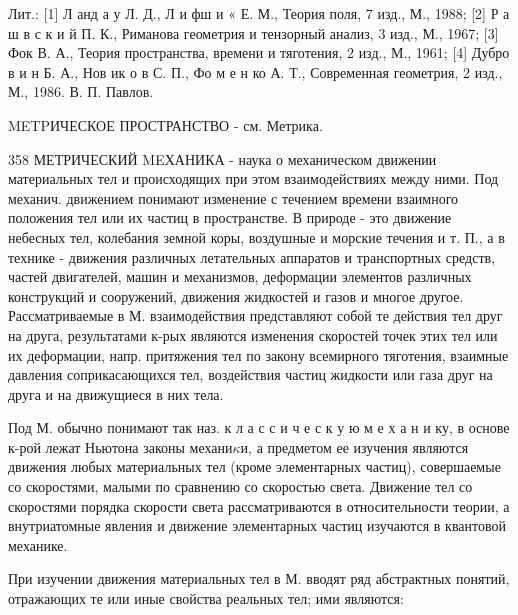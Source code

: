 \documentclass[10pt]{article}
\begin{document}
Лит.: [1] Л анд а у Л. Д., Л и фш и « Е. М., Теория поля, 7 изд., М., 1988; [2] Р а ш в с к и й П. К., Риманова геометрия и тензорный анализ, 3 изд., М., 1967; [3] Фок В. А., Теория пространства, времени и тяготения, 2 изд., М., 1961; [4] Дубро в и н Б. А., Нов ик о в С. П., Фо м е н ко А. Т., Современная геометрия, 2 изд., М., 1986. В. П. Павлов.



METPИЧЕСКОЕ ПРОСТРАНСТВО - см. Метрика.



358 МЕТРИЧЕСКИЙ MEХАНИКА - наука о механическом движении материальных тел и происходящих при этом взаимодействиях между ними. Под механич. движением понимают изменение с течением времени взаимного положения тел или их частиц в пространстве. В природе - это движение небесных тел, колебания земной коры, воздушные и морские течения и т. П., а в технике - движения различных летательных аппаратов и транспортных средств, частей двигателей, машин и механизмов, деформации элементов различных конструкций и сооружений, движения жидкостей и газов и многое другое. Рассматриваемые в М. взаимодействия представляют собой те действия тел друг на друга, результатами к-рых являются изменения скоростей точек этих тел или их деформации, напр. притяжения тел по закону всемирного тяготения, взаимные давления соприкасающихся тел, воздействия частиц жидкости или газа друг на друга и на движущиеся в них тела.



Под М. обычно понимают так наз. к л а с с и ч е с к у ю м е х а н и ку, в основе к-рой лежат Ньютона законы механи$\kappa и$, а предметом ее изучения являются движения любых материальных тел (кроме элементарных частиц), совершаемые со скоростями, малыми по сравнению со скоростью света. Движение тел со скоростями порядка скорости света рассматриваются в относительности теории, а внутриатомные явления и движение элементарных частиц изучаются в квантовой механике.



При изучении движения материальных тел в М. вводят ряд абстрактных понятий, отражающих те или иные свойства реальных тел; ими являются:
\end{document}
